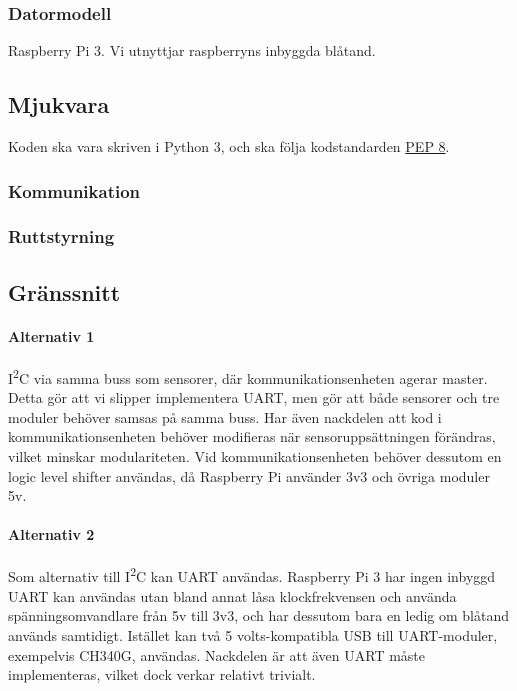 \documentclass[a4paper,11pt]{article}
\begin{document}
\subsubsection{Datormodell}
Raspberry Pi 3. Vi utnyttjar raspberryns inbyggda blåtand.

\subsection{Mjukvara}

Koden ska vara skriven i Python 3, och ska följa kodstandarden \href{https://www.python.org/dev/peps/pep-0008/}{PEP 8}.

\subsubsection{Kommunikation}

\subsubsection{Ruttstyrning}

\subsection{Gränssnitt} \label{ssec:brainInterface}

\paragraph{Alternativ 1}
I\textsuperscript{2}C via samma buss som sensorer, där kommunikationsenheten agerar master. Detta gör att vi slipper implementera UART, men gör att både sensorer och tre moduler behöver samsas på samma buss. Har även nackdelen att kod i kommunikationsenheten behöver modifieras när sensoruppsättningen förändras, vilket minskar modulariteten. %
Vid kommunikationsenheten behöver dessutom en logic level shifter användas, då Raspberry Pi använder 3v3 och övriga moduler 5v.

\paragraph{Alternativ 2}
Som alternativ till I\textsuperscript{2}C kan UART användas. Raspberry Pi 3 har ingen inbyggd UART kan användas utan bland annat låsa klockfrekvensen och använda spänningsomvandlare från 5v till 3v3, och har dessutom bara en ledig om blåtand används samtidigt. Istället kan två 5 volts-kompatibla USB till UART-moduler, exempelvis CH340G, användas. Nackdelen är att även UART måste implementeras, vilket dock verkar relativt trivialt. %
\end{document}
